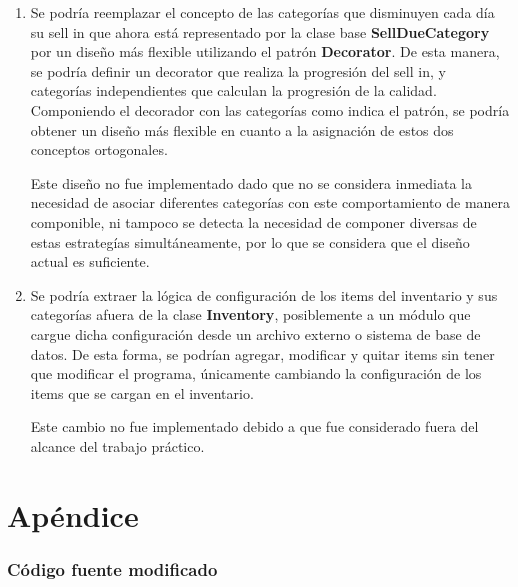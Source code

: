 \documentclass[a4paper,11pt]{article}
\begin{document}
\begin{enumerate}

  \item Se podría reemplazar el concepto de las categorías que disminuyen cada
    día su sell in que ahora está representado por la clase base
    \textbf{SellDueCategory} por un diseño más flexible utilizando el patrón
    \textbf{Decorator}. De esta manera, se podría definir un decorator que
    realiza la progresión del sell in, y categorías independientes que calculan
    la progresión de la calidad. Componiendo el decorador con las categorías
    como indica el patrón, se podría obtener un diseño más flexible en cuanto a
    la asignación de estos dos conceptos ortogonales.

    Este diseño no fue implementado dado que no se considera inmediata la
    necesidad de asociar diferentes categorías con este comportamiento de
    manera componible, ni tampoco se detecta la necesidad de componer diversas
    de estas estrategías simultáneamente, por lo que se considera que el diseño
    actual es suficiente.

  \item Se podría extraer la lógica de configuración de los items del
    inventario y sus categorías afuera de la clase \textbf{Inventory},
    posiblemente a un módulo que cargue dicha configuración desde un archivo
    externo o sistema de base de datos. De esta forma, se podrían agregar,
    modificar y quitar items sin tener que modificar el programa, únicamente
    cambiando la configuración de los items que se cargan en el inventario.

    Este cambio no fue implementado debido a que fue considerado fuera del
    alcance del trabajo práctico.

\end{enumerate}

\clearpage

\part{Apéndice}
\appendix

\section{Código fuente modificado}
\end{document}
